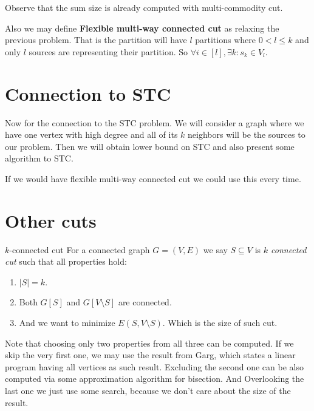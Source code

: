 \documentclass{article}
\begin{document}
	\noindent Observe that the sum size is already computed with multi-commodity cut.
	
	\noindent Also we may define \textbf{Flexible multi-way connected cut} as relaxing the previous problem. That is the partition will have $l$ partitions where $0 < l \leq k$ and only $l$ sources are representing their partition. So $\forall i \in [l] , \exists k : s_k \in V_l$.
	
	\section{Connection to STC}
	
	Now for the connection to the STC problem. We will consider a graph where we have one vertex with high degree and all of its $k$ neighbors will be the sources to our problem. Then we will obtain lower bound on STC and also present some algorithm to STC.
	
	If we would have flexible multi-way connected cut we could use this every time.
	
	\section{Other cuts}
	
	\begin{defn}{$k$-connected cut}
		For a connected graph $G = (V,E)$ we say $S \subseteq V$ is \textit{$k$ connected cut} such that all properties hold:
		
		\begin{enumerate}
			\item $|S| = k$.
			\item Both $G[S]$ and $G[V \setminus S]$ are connected.
			\item And we want to minimize $E(S, V \setminus S)$. Which is the size of such cut.
		\end{enumerate}
	\end{defn}
	
	\noindent Note that choosing only two properties from all three can be computed. If we skip the very first one, we may use the result from Garg, which states a linear program having all vertices as such result. Excluding the second one can be also computed via some approximation algorithm for bisection. And Overlooking the last one we just use some search, because we don't care about the size of the result.
\end{document}
